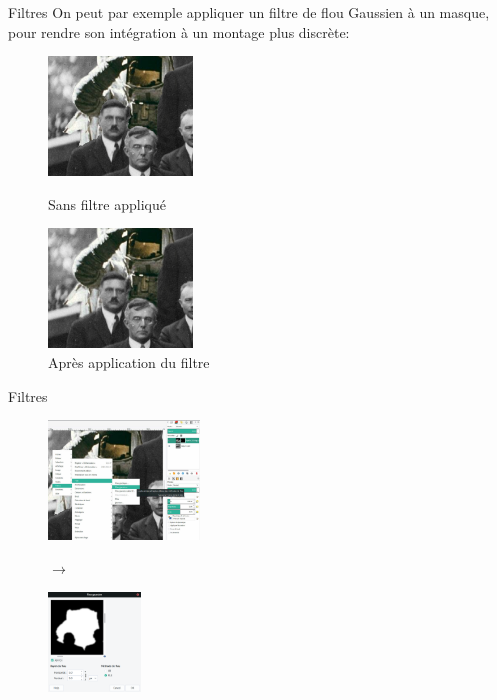 \documentclass[10pt,svgnames,usenames,table]{beamer}
\begin{document}
\begin{frame}{Filtres}
		On peut par exemple appliquer un filtre de flou Gaussien à un masque, pour rendre son intégration à un montage plus discrète:
		\begin{figure}[H]
			\centering
			\begin{minipage}{.5\textwidth}
				\centering
				\includegraphics[height=120px]{Images/filters/astro0} 
				\caption{Sans filtre appliqué}
			\end{minipage}%
			\begin{minipage}{.5\textwidth}
				\centering
				\includegraphics[height=120px]{Images/filters/astro1} 
				\caption{Après application du filtre}
			\end{minipage}
		\end{figure}		
\end{frame}		


	\begin{frame}{Filtres}
		\begin{figure}[H]
			\centering
			\begin{minipage}{.6\textwidth}
				\centering
				\includegraphics[height=120px]{Images/filters/astroBlur} 
				\end{minipage}$\rightarrow$%
			\begin{minipage}{.4\textwidth}
				\centering
				\includegraphics[height=100px]{Images/filters/gaussBlur} 
				\end{minipage}

			\end{figure}		
	\end{frame}
\end{document}
